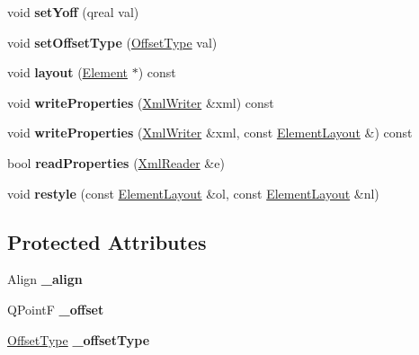 \begin{DoxyCompactItemize}
\mbox{\label{class_ms_1_1_element_layout_a92a269a0a050fabfd5e6b0dc9c3da920}} 
void {\bfseries set\+Yoff} (qreal val)
\item 
\mbox{\label{class_ms_1_1_element_layout_a01ce20de8c67a33b44d92a85d374aaea}} 
void {\bfseries set\+Offset\+Type} (\hyperlink{namespace_ms_afe84fbdef0df9b3922d749984380e57a}{Offset\+Type} val)
\item 
\mbox{\label{class_ms_1_1_element_layout_a4800323a6a96ebf5cdf8f18bc34a4739}} 
void {\bfseries layout} (\hyperlink{class_ms_1_1_element}{Element} $\ast$) const
\item 
\mbox{\label{class_ms_1_1_element_layout_a8c7ad08ff69b73f4ce71cfc1e736681b}} 
void {\bfseries write\+Properties} (\hyperlink{class_ms_1_1_xml_writer}{Xml\+Writer} \&xml) const
\item 
\mbox{\label{class_ms_1_1_element_layout_a3361ff48ddfd5f168248db5f27c1d7b0}} 
void {\bfseries write\+Properties} (\hyperlink{class_ms_1_1_xml_writer}{Xml\+Writer} \&xml, const \hyperlink{class_ms_1_1_element_layout}{Element\+Layout} \&) const
\item 
\mbox{\label{class_ms_1_1_element_layout_ad4838ddf3bf728664b30cb7e73ac5d82}} 
bool {\bfseries read\+Properties} (\hyperlink{class_ms_1_1_xml_reader}{Xml\+Reader} \&e)
\item 
\mbox{\label{class_ms_1_1_element_layout_a9fc0582d8ef41f9a46af4829e4b1f146}} 
void {\bfseries restyle} (const \hyperlink{class_ms_1_1_element_layout}{Element\+Layout} \&ol, const \hyperlink{class_ms_1_1_element_layout}{Element\+Layout} \&nl)
\end{DoxyCompactItemize}
\subsection*{Protected Attributes}
\begin{DoxyCompactItemize}
\item 
\mbox{\label{class_ms_1_1_element_layout_a2ba36e3cc56b685b877b91c7495cc0a9}} 
Align {\bfseries \+\_\+align}
\item 
\mbox{\label{class_ms_1_1_element_layout_a520671050046bfc1c136735f98db1ea9}} 
Q\+PointF {\bfseries \+\_\+offset}
\item 
\mbox{\label{class_ms_1_1_element_layout_a0894b476e43693cfb4828d9e757551d8}} 
\hyperlink{namespace_ms_afe84fbdef0df9b3922d749984380e57a}{Offset\+Type} {\bfseries \+\_\+offset\+Type}
\end{DoxyCompactItemize}


